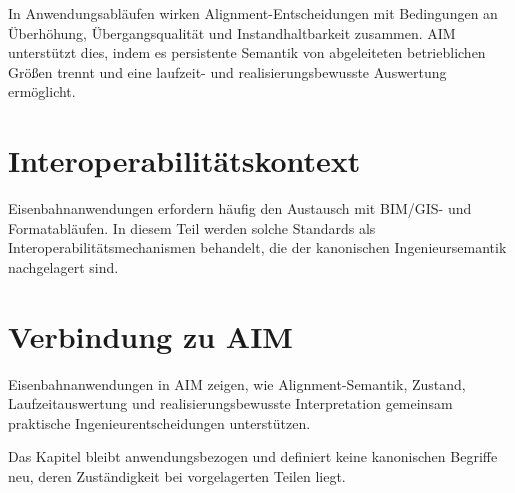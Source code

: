 In Anwendungsabläufen wirken Alignment-Entscheidungen mit Bedingungen an
Überhöhung, Übergangsqualität und Instandhaltbarkeit zusammen. AIM
unterstützt dies, indem es persistente Semantik von abgeleiteten
betrieblichen Größen trennt und eine laufzeit- und realisierungsbewusste
Auswertung ermöglicht.

\section{Interoperabilitätskontext}

Eisenbahnanwendungen erfordern häufig den Austausch mit BIM/GIS- und
Formatabläufen. In diesem Teil werden solche Standards als
Interoperabilitätsmechanismen behandelt, die der kanonischen
Ingenieursemantik nachgelagert sind.

\section{Verbindung zu AIM}

\begin{summary}
Eisenbahnanwendungen in AIM zeigen, wie Alignment-Semantik, Zustand,
Laufzeitauswertung und realisierungsbewusste Interpretation gemeinsam
praktische Ingenieurentscheidungen unterstützen.

Das Kapitel bleibt anwendungsbezogen und definiert keine kanonischen
Begriffe neu, deren Zuständigkeit bei vorgelagerten Teilen liegt.
\end{summary}
